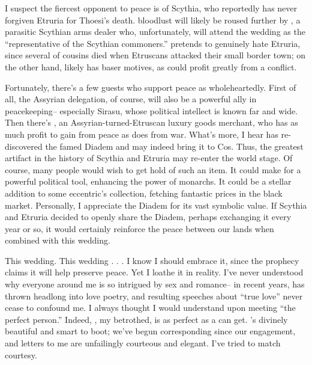 \documentclass[char]{Kos}
\begin{document}
I suspect the fiercest opponent to peace is \cScythiaQueen{\Monarch} \cScythiaQueen{} of Scythia, who reportedly has never forgiven Etruria for Thoesi's death. \cScythiaQueen{\Their} bloodlust will likely be roused further by \cArmsDealer{}, a parasitic Scythian arms dealer who, unfortunately, will attend the wedding as the ``representative of the Scythian commoners.'' \cArmsDealer{\They} pretends to genuinely hate Etruria, since several of \cArmsDealer{\their} cousins died when Etruscans attacked their small border town; on the other hand, \cArmsDealer{\they} likely has baser motives, as \cArmsDealer{\they} could profit greatly from a conflict. 

Fortunately, there's a few guests who support peace as wholeheartedly. First of all, the Assyrian delegation, of course, will also be a powerful ally in peacekeeping-- especially Sirasu, whose political intellect is known far and wide. Then there's \cMerchant{}, an Assyrian-turned-Etruscan luxury goods merchant, who has as much profit to gain from peace as \cArmsDealer{} does from war. What's more, I hear \cMerchant{} has re-discovered the famed Diadem and may indeed bring it to Cos. Thus, the greatest artifact in the history of Scythia and Etruria may re-enter the world stage. Of course, many people would wish to get hold of such an item. It could make for a powerful political tool, enhancing the power of monarchs. It could be a stellar addition to some eccentric's collection, fetching fantastic prices in the black market. Personally, I appreciate the Diadem for its vast symbolic value. If Scythia and Etruria decided to openly share the Diadem, perhaps exchanging it every year or so, it would certainly reinforce the peace between our lands when combined with this wedding.

This wedding. This wedding . . . I know I should embrace it, since the prophecy claims it will help preserve peace. Yet I loathe it in reality. I've never understood why everyone around me is so intrigued by sex and romance-- in recent years, \cPoet{} has thrown \cPoet{\themself} headlong into love poetry, and \cPoet{\their} resulting speeches about ``true love'' never cease to confound me. I always thought I would understand upon meeting ``the perfect person.'' Indeed, \cBride{}, my betrothed, is as perfect as a \cBride{\human} can get. \cBride{\They}'s divinely beautiful and smart to boot; we've begun corresponding since our engagement, and \cBride{\their} letters to me are unfailingly courteous and elegant. I've tried to match \cBride{\their} courtesy. 
\end{document}
